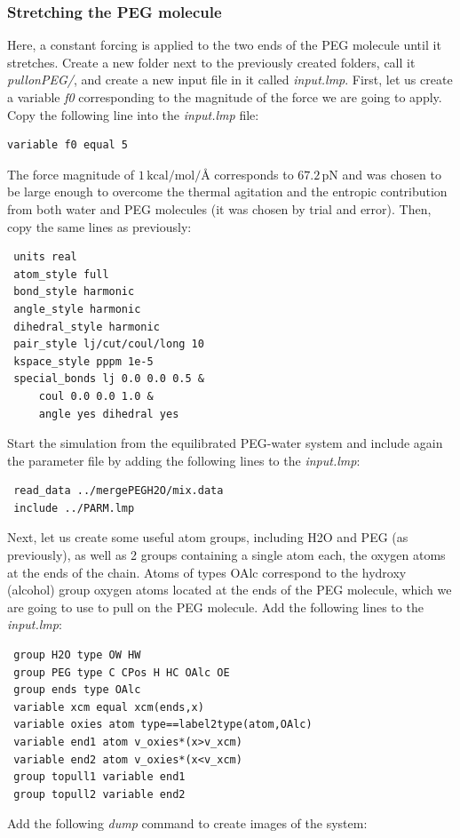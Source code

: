 \documentclass[9pt,tutorial]{livecoms}
\begin{document}
\subsubsection{Stretching the PEG molecule}
Here, a constant forcing is applied to the two ends of the PEG molecule until it
stretches. Create a new folder next to the previously created folders, call it
\textit{pullonPEG/}, and create a new input file in it called \textit{input.lmp}.
First, let us create a variable \textit{f0} corresponding to the magnitude of the
force we are going to apply. Copy the following line into the \textit{input.lmp} file:
{\normalsize \begin{verbatim}
variable f0 equal 5
\end{verbatim}}
The force magnitude of $1\,\text{kcal/mol/\AA{}}$ corresponds to $67.2\,\text{pN}$
and was chosen to be large enough to overcome the thermal agitation and the entropic
contribution from both water and PEG molecules (it was chosen by trial and error).
Then, copy the same lines as previously:
{\normalsize \begin{verbatim}
 units real
 atom_style full
 bond_style harmonic
 angle_style harmonic
 dihedral_style harmonic
 pair_style lj/cut/coul/long 10
 kspace_style pppm 1e-5
 special_bonds lj 0.0 0.0 0.5 &
     coul 0.0 0.0 1.0 &
     angle yes dihedral yes
\end{verbatim}}
Start the simulation from the equilibrated PEG-water system and include again the
parameter file by adding the following lines to the \textit{input.lmp}:
{\normalsize \begin{verbatim}
 read_data ../mergePEGH2O/mix.data
 include ../PARM.lmp
\end{verbatim}}
Next, let us create some useful atom groups, including H2O and PEG (as previously),
as well as 2 groups containing a single atom each, the oxygen atoms at the ends
of the chain. Atoms of types OAlc correspond to the hydroxy (alcohol) group oxygen
atoms located at the ends of the PEG molecule, which we are going to use to pull
on the PEG molecule. Add the following lines to the \textit{input.lmp}:
{\normalsize \begin{verbatim}
 group H2O type OW HW
 group PEG type C CPos H HC OAlc OE
 group ends type OAlc
 variable xcm equal xcm(ends,x)
 variable oxies atom type==label2type(atom,OAlc)
 variable end1 atom v_oxies*(x>v_xcm)
 variable end2 atom v_oxies*(x<v_xcm)
 group topull1 variable end1
 group topull2 variable end2
\end{verbatim}}
Add the following \textit{dump} command to create images of the system:
\end{document}
